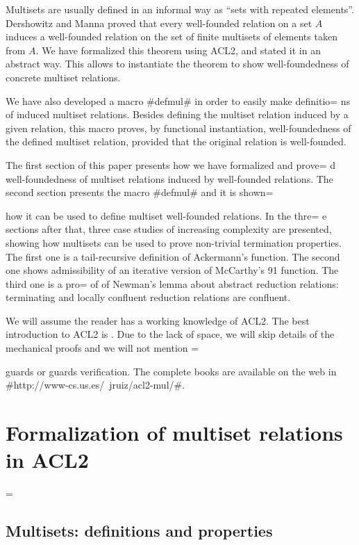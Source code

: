 \documentclass[11pt]{llncs}
\begin{document}
Multisets are usually defined in an informal way as ``sets with repeated
elements''. Dershowitz and Manna \cite{DM-multiset} proved that every
well-founded relation on a set $A$ induces a well-founded relation on
the set of finite multisets of elements taken from $A$. We have
formalized this theorem using ACL2, and stated it in an abstract
way. This allows to instantiate the theorem to show well-foun\-ded\-ness
of concrete multiset relations.

We have also developed a macro #defmul# in order to easily make definitio=
ns of
induced multiset relations. Besides defining the multiset relation
induced by a given relation, this macro proves, by functional
instantiation, well-foundedness of the defined multiset relation,
provided that the original relation is well-founded.

The first section of this paper presents how we have formalized and prove=
d
well\--foun\-ded\-ness of multiset relations induced by well-founded
relations. The second section presents the macro #defmul# and it is shown=

how it can be used to define multiset well-founded relations. In the thre=
e
sections after that, three case studies of increasing complexity are
presented, showing how multisets can be used to prove
non-trivial termination properties. The first one is a tail-recursive
definition of Ackermann's function. The second one shows admissibility
of an iterative version of McCarthy's 91 function. The third one is a pro=
of
of Newman's lemma about abstract reduction relations: terminating and
locally confluent reduction relations are confluent.

We will assume the reader has a working knowledge of ACL2. The best
introduction to ACL2 is \cite{acl2-libro}. Due to the lack of space, we
will skip details of the mechanical proofs and we will not mention =

guards or guards verification. The complete books are available on the
web in #http://www-cs.us.es/~jruiz/acl2-mul/#.

\section{Formalization of multiset relations in ACL2}
 =

\subsection{Multisets: definitions and properties}
\label{mult-theory}
\end{document}
